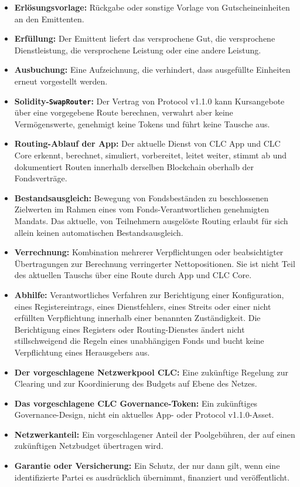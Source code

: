 \documentclass[11pt]{article}
\begin{document}
\begin{itemize}[leftmargin=*]
\item \textbf{Erlösungsvorlage:} Rückgabe oder sonstige Vorlage von Gutscheineinheiten an den Emittenten.
\item \textbf{Erfüllung:} Der Emittent liefert das versprochene Gut, die versprochene Dienstleistung, die versprochene Leistung oder eine andere Leistung.
\item \textbf{Ausbuchung:} Eine Aufzeichnung, die verhindert, dass ausgefüllte Einheiten erneut vorgestellt werden.
\item \textbf{Solidity-\texttt{SwapRouter}:} Der Vertrag von Protocol v1.1.0 kann Kursangebote über eine vorgegebene Route berechnen, verwahrt aber keine Vermögenswerte, genehmigt keine Tokens und führt keine Tausche aus.
\item \textbf{Routing-Ablauf der App:} Der aktuelle Dienst von CLC App und CLC Core erkennt, berechnet, simuliert, vorbereitet, leitet weiter, stimmt ab und dokumentiert Routen innerhalb derselben Blockchain oberhalb der Fondsverträge.
\item \textbf{Bestandsausgleich:} Bewegung von Fondsbeständen zu beschlossenen Zielwerten im Rahmen eines vom Fonds-Verantwortlichen genehmigten Mandats. Das aktuelle, von Teilnehmern ausgelöste Routing erlaubt für sich allein keinen automatischen Bestandsausgleich.
\item \textbf{Verrechnung:} Kombination mehrerer Verpflichtungen oder beabsichtigter Übertragungen zur Berechnung verringerter Nettopositionen. Sie ist nicht Teil des aktuellen Tauschs über eine Route durch App und CLC Core.
\item \textbf{Abhilfe:} Verantwortliches Verfahren zur Berichtigung einer Konfiguration, eines Registereintrags, eines Dienstfehlers, eines Streits oder einer nicht erfüllten Verpflichtung innerhalb einer benannten Zuständigkeit. Die Berichtigung eines Registers oder Routing-Dienstes ändert nicht stillschweigend die Regeln eines unabhängigen Fonds und bucht keine Verpflichtung eines Herausgebers aus.
\item \textbf{Der vorgeschlagene Netzwerkpool CLC:} Eine zukünftige Regelung zur Clearing und zur Koordinierung des Budgets auf Ebene des Netzes.
\item \textbf{Das vorgeschlagene CLC Governance-Token:} Ein zukünftiges Governance-Design, nicht ein aktuelles App- oder Protocol v1.1.0-Asset.
\item \textbf{Netzwerkanteil:} Ein vorgeschlagener Anteil der Poolgebühren, der auf einen zukünftigen Netzbudget übertragen wird.
\item \textbf{Garantie oder Versicherung:} Ein Schutz, der nur dann gilt, wenn eine identifizierte Partei es ausdrücklich übernimmt, finanziert und veröffentlicht.
\end{itemize}
\end{document}

